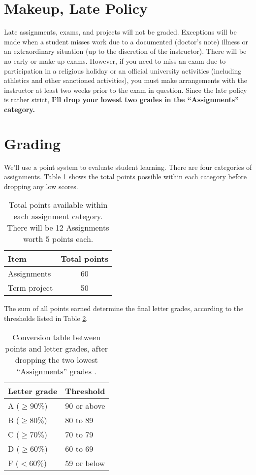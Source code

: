 \documentclass[11pt,onecolumn]{article}
\begin{document}
\section*{Makeup, Late Policy}
Late assignments, exams, and projects will not be graded. Exceptions will be made when a student misses work due to a documented (doctor's note) illness or an extraordinary situation (up to the discretion of the instructor). There will be no early or make-up exams. However, if you need to miss an exam due to participation in a religious holiday or an official university activities (including athletics and other sanctioned activities), you must make arrangements with the instructor at least two weeks prior to the exam in question. Since the late policy is rather strict, \textbf{I'll drop your lowest two grades in the ``Assignments'' category.}

\section*{Grading}

We'll use a point system to evaluate student learning. There are four categories of assignments. Table \ref{tab:points} shows the total points possible within each category before dropping any low scores.

\begin{table}[h]
  \begin{center}
  \begin{tabular}{l|c}	%
Item& Total points \\\hline\hline
  Assignments& 60 \\
  Term project & 50 \\
  \end{tabular}
  \caption{Total points available within each assignment category. There will be 12 Assignments worth 5 points each. \label{tab:points}}
\end{center}

\end{table}

The sum of all points earned determine the final letter grades, according to the thresholds listed in Table \ref{tab:grade}.

\begin{table}[h]
\begin{center}
  \begin{tabular}{l|l}
    Letter grade & Threshold\\\hline\hline
A ($\geq 90\%$)&90 or above\\
B ($\geq 80\%$)&80 to 89\\
C ($\geq 70\%$)&70 to 79\\
D ($\geq 60\%$)&60 to 69\\
F ($< 60\%$)&59 or below
  \end{tabular}
  \caption{Conversion table between points and letter grades, after dropping the two lowest ``Assignments'' grades .\label{tab:grade}}
\end{center}

\end{table}
\end{document}
